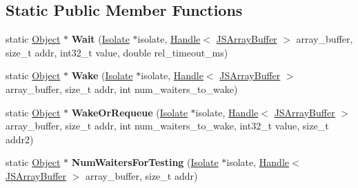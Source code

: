 \subsection*{Static Public Member Functions}
\begin{DoxyCompactItemize}
\item 
static \hyperlink{classv8_1_1internal_1_1_object}{Object} $\ast$ {\bfseries Wait} (\hyperlink{classv8_1_1internal_1_1_isolate}{Isolate} $\ast$isolate, \hyperlink{classv8_1_1internal_1_1_handle}{Handle}$<$ \hyperlink{classv8_1_1internal_1_1_j_s_array_buffer}{J\+S\+Array\+Buffer} $>$ array\+\_\+buffer, size\+\_\+t addr, int32\+\_\+t value, double rel\+\_\+timeout\+\_\+ms)\hypertarget{classv8_1_1internal_1_1_futex_emulation_ac465f50c7ed498ef70cb87c233af910f}{}\label{classv8_1_1internal_1_1_futex_emulation_ac465f50c7ed498ef70cb87c233af910f}

\item 
static \hyperlink{classv8_1_1internal_1_1_object}{Object} $\ast$ {\bfseries Wake} (\hyperlink{classv8_1_1internal_1_1_isolate}{Isolate} $\ast$isolate, \hyperlink{classv8_1_1internal_1_1_handle}{Handle}$<$ \hyperlink{classv8_1_1internal_1_1_j_s_array_buffer}{J\+S\+Array\+Buffer} $>$ array\+\_\+buffer, size\+\_\+t addr, int num\+\_\+waiters\+\_\+to\+\_\+wake)\hypertarget{classv8_1_1internal_1_1_futex_emulation_a341ce7dcfce57ddf64c6f66e4eab3e14}{}\label{classv8_1_1internal_1_1_futex_emulation_a341ce7dcfce57ddf64c6f66e4eab3e14}

\item 
static \hyperlink{classv8_1_1internal_1_1_object}{Object} $\ast$ {\bfseries Wake\+Or\+Requeue} (\hyperlink{classv8_1_1internal_1_1_isolate}{Isolate} $\ast$isolate, \hyperlink{classv8_1_1internal_1_1_handle}{Handle}$<$ \hyperlink{classv8_1_1internal_1_1_j_s_array_buffer}{J\+S\+Array\+Buffer} $>$ array\+\_\+buffer, size\+\_\+t addr, int num\+\_\+waiters\+\_\+to\+\_\+wake, int32\+\_\+t value, size\+\_\+t addr2)\hypertarget{classv8_1_1internal_1_1_futex_emulation_adef6f70752a18c2bb8ba6dc30dff1646}{}\label{classv8_1_1internal_1_1_futex_emulation_adef6f70752a18c2bb8ba6dc30dff1646}

\item 
static \hyperlink{classv8_1_1internal_1_1_object}{Object} $\ast$ {\bfseries Num\+Waiters\+For\+Testing} (\hyperlink{classv8_1_1internal_1_1_isolate}{Isolate} $\ast$isolate, \hyperlink{classv8_1_1internal_1_1_handle}{Handle}$<$ \hyperlink{classv8_1_1internal_1_1_j_s_array_buffer}{J\+S\+Array\+Buffer} $>$ array\+\_\+buffer, size\+\_\+t addr)\hypertarget{classv8_1_1internal_1_1_futex_emulation_a72bec66ce45b32846d170cb7f9acf772}{}\label{classv8_1_1internal_1_1_futex_emulation_a72bec66ce45b32846d170cb7f9acf772}

\end{DoxyCompactItemize}
